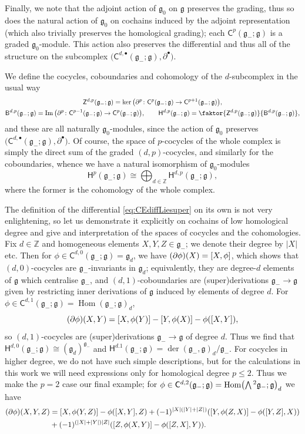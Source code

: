 \documentclass[11pt]{article}
\numberwithin{equation}{section}
\numberwithin{equation}{section}
\newcommand{\fg}{\mathfrak{g}}
\newcommand{\ZZ}{\mathbb{Z}}
\newcommand{\ssB}{\mathsf{B}}
\newcommand{\ssC}{\mathsf{C}}
\newcommand{\ssH}{\mathsf{H}}
\newcommand{\ssZ}{\mathsf{Z}}
\newcommand{\Wedge}{\mathchoice{{\textstyle\bigwedge}}{\bigwedge}{\bigwedge}{\bigwedge}}	%
\newcommand{\1}{\mathbbm{1}}
\DeclareMathOperator{\Hom}{Hom}
\begin{document}
Finally, we note that the adjoint action of $\fg_0$ on $\fg$ preserves the grading, thus so does the natural action of $\fg_0$ on cochains induced by the adjoint representation (which also trivially preserves the homological grading); each $\ssC^p(\fg_-;\fg)$ is a graded $\fg_0$-module. This action also preserves the differential and thus all of the structure on the subcomplex $\bigl(\ssC^{d,\bullet}(\fg_-;\fg),\partial^\bullet\bigr)$.


We define the cocycles, coboundaries and cohomology of the $d$-subcomplex in the usual way
\begin{gather*}
	\ssZ^{d,p}(\fg_-;\fg) = \ker\qty(\partial^p\colon \ssC^p(\fg_-;\fg)\to \ssC^{p+1}(\fg_-;\fg)),	\\
	\ssB^{d,p}(\fg_-;\fg) = \Im\qty(\partial^p\colon \ssC^{p-1}(\fg_-;\fg)\to \ssC^{p}(\fg_-;\fg)),	\qquad
	\ssH^{d,p}(\fg_-;\fg) = \faktor{\ssZ^{d,p}(\fg_-;\fg)}{\ssB^{d,p}(\fg_-;\fg)},
\end{gather*}
and these are all naturally $\fg_0$-modules, since the action of $\fg_0$ preserves $\bigl(\ssC^{d,\bullet}(\fg_-;\fg),\partial^\bullet\bigr)$. Of course, the space of $p$-cocycles of the whole complex is simply the direct sum of the graded $(d,p)$-cocycles, and similarly for the coboundaries, whence we have a natural isomorphism of $\fg_0$-modules
\[
	\ssH^p(\fg_-;\fg) \cong \bigoplus_{d\in\ZZ}\ssH^{d,p}(\fg_-;\fg),
\]
where the former is the cohomology of the whole complex.

The definition of the differential \eqref{eq:CEdiffLiesuper} on its own is not very enlightening, so let us demonstrate it explicitly on cochains of low homological degree and give and interpretation of the spaces of cocycles and the cohomologies. Fix $d\in\ZZ$ and homogeneous elements $X,Y,Z\in\fg_-$; we denote their degree by $|X|$ etc. Then for $\phi\in\ssC^{d,0}(\fg_-;\fg)=\fg_d$, we have
$(\partial \phi)(X) = \comm{X}{\phi}$,
which shows that $(d,0)$-cocycles are $\fg_-$-invariants in $\fg_d$; equivalently, they are degree-$d$ elements of $\fg$ which centralise $\fg_-$, and $(d,1)$-coboundaries are (super)derivations $\fg_-\to\fg$ given by restricting inner derivations of $\fg$ induced by elements of degree $d$. For $\phi\in\ssC^{d,1}(\fg_-;\fg)=\Hom(\fg_-;\fg)_d$,
\[
	(\partial \phi)(X,Y) = \comm{X}{\phi(Y)} - \comm{Y}{\phi(X)} -\phi(\comm{X}{Y}),
\]
so $(d,1)$-cocycles are (super)derivations $\fg_-\to\fg$ of degree $d$. Thus we find that $\ssH^{d,0}(\fg_-;\fg) \cong (\fg_d)^{\fg_-}$ and $\ssH^{d.1}(\fg_-;\fg)=\operatorname{der}(\fg_-,\fg)_d/\fg_-$. For cocycles in higher degree, we do not have such simple descriptions, but for the calculations in this work we will need expressions only for homological degree $p\leq 2$. Thus we make the $p=2$ case our final example; for $\phi\in\ssC^{d,2}(\fg_-;\fg)=\Hom\bigl(\Wedge^2\fg_-;\fg\bigr)_d$ we have
\begin{align*}
	(\partial \phi)(X,Y,Z) &= \comm{X}{\phi(Y,Z)} - \phi(\comm{X}{Y},Z) + (-1)^{|X|(|Y|+|Z|)} \qty( \comm{Y}{\phi(Z,X)} - \phi(\comm{Y}{Z},X) )\\
		& + (-1)^{(|X|+|Y|)|Z|} \qty( \comm{Z}{\phi(X,Y)} - \phi(\comm{Z}{X},Y) ).
\end{align*}
\end{document}
